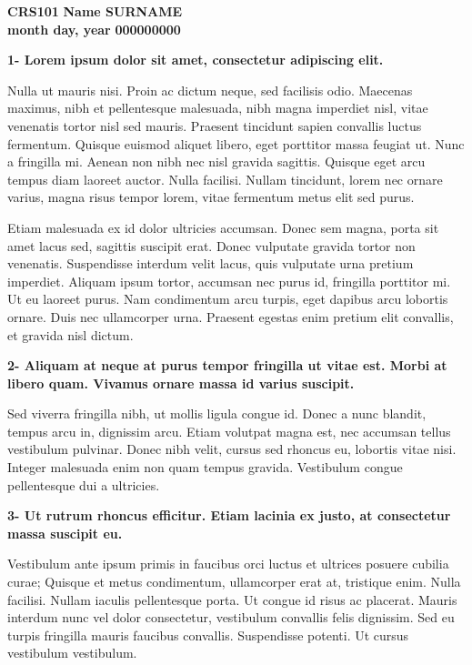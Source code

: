 \documentclass[a4paper, 11pt]{article}
\begin{document}


\textbf{CRS101}     \hfill \textbf{Name SURNAME}\\
\textbf{month day, year} \hfill \textbf{000000000}

\vspace{10pt}

\textbf{1- Lorem ipsum dolor sit amet, consectetur adipiscing elit.}

Nulla ut mauris nisi. Proin ac dictum neque, sed facilisis odio. Maecenas maximus, nibh et pellentesque malesuada, nibh magna imperdiet nisl, vitae venenatis tortor nisl sed mauris. Praesent tincidunt sapien convallis luctus fermentum. Quisque euismod aliquet libero, eget porttitor massa feugiat ut. Nunc a fringilla mi. Aenean non nibh nec nisl gravida sagittis. Quisque eget arcu tempus diam laoreet auctor. Nulla facilisi. Nullam tincidunt, lorem nec ornare varius, magna risus tempor lorem, vitae fermentum metus elit sed purus.

Etiam malesuada ex id dolor ultricies accumsan. Donec sem magna, porta sit amet lacus sed, sagittis suscipit erat. Donec vulputate gravida tortor non venenatis. Suspendisse interdum velit lacus, quis vulputate urna pretium imperdiet. Aliquam ipsum tortor, accumsan nec purus id, fringilla porttitor mi. Ut eu laoreet purus. Nam condimentum arcu turpis, eget dapibus arcu lobortis ornare. Duis nec ullamcorper urna. Praesent egestas enim pretium elit convallis, et gravida nisl dictum.

\textbf{2- Aliquam at neque at purus tempor fringilla ut vitae est. Morbi at libero quam. Vivamus ornare massa id varius suscipit.}

Sed viverra fringilla nibh, ut mollis ligula congue id. Donec a nunc blandit, tempus arcu in, dignissim arcu. Etiam volutpat magna est, nec accumsan tellus vestibulum pulvinar. Donec nibh velit, cursus sed rhoncus eu, lobortis vitae nisi. Integer malesuada enim non quam tempus gravida. Vestibulum congue pellentesque dui a ultricies.

\textbf{3- Ut rutrum rhoncus efficitur. Etiam lacinia ex justo, at consectetur massa suscipit eu.}

Vestibulum ante ipsum primis in faucibus orci luctus et ultrices posuere cubilia curae; Quisque et metus condimentum, ullamcorper erat at, tristique enim. Nulla facilisi. Nullam iaculis pellentesque porta. Ut congue id risus ac placerat. Mauris interdum nunc vel dolor consectetur, vestibulum convallis felis dignissim. Sed eu turpis fringilla mauris faucibus convallis. Suspendisse potenti. Ut cursus vestibulum vestibulum.
\end{document}
